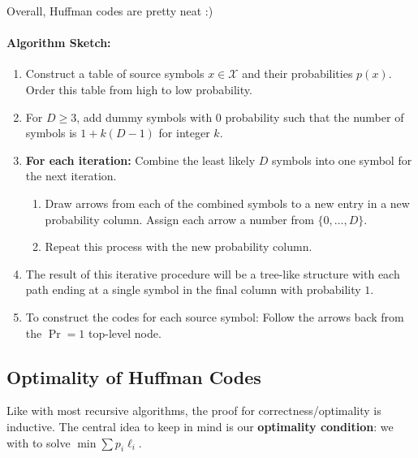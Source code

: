 \documentclass[a4paper,12pt]{report}
\begin{document}
Overall, Huffman codes are pretty neat :) 

\paragraph{Algorithm Sketch:} 
\begin{enumerate}
	\item Construct a table of source symbols $x\in \mathcal X$ and their
	probabilities $p(x)$. Order this table from high to low probability.
	\item For $D \geq 3$, add dummy symbols with $0$ probability such that the
	number of symbols is $1 + k(D-1)$ for integer $k$.
	\item \textbf{For each iteration:} Combine the least likely $D$ symbols into one
	symbol for the next iteration.
	\begin{enumerate}
		\item Draw arrows from each of the combined symbols to a new entry in a
		new probability column. Assign each arrow a number from $\{0,\dots,D\}$.
		\item Repeat this process with the new probability column. 
	\end{enumerate}
	\item The result of this iterative procedure will be a tree-like structure
	with each path ending at a single symbol in the final column with
	probability $1$.
	\item To construct the codes for each source symbol: Follow the arrows back
	from the $\Pr = 1$ top-level node. 
\end{enumerate}




\subsection{Optimality of Huffman Codes}

Like with most recursive algorithms, the proof for correctness/optimality is
inductive. The central idea to keep in mind is our \textbf{optimality
condition}: we with to solve $\min \sum p_i \ell_i$. 
\end{document}
